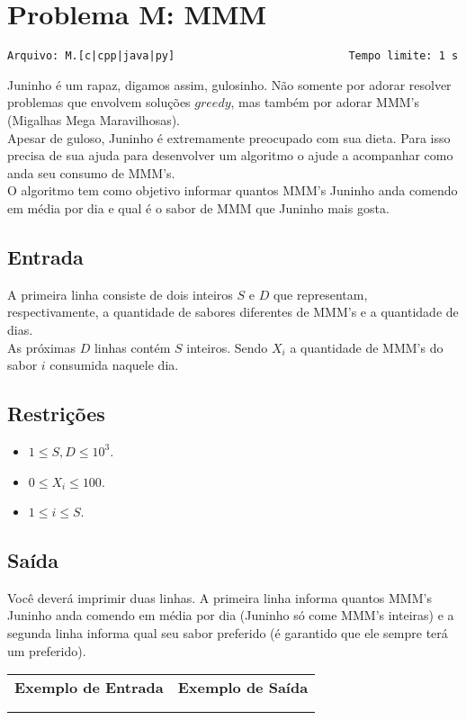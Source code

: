 \section{Problema M: MMM}
\vspace{-0.52cm}
\noindent \begin{verbatim}Arquivo: M.[c|cpp|java|py]                           Tempo limite: 1 s
\end{verbatim}

Juninho é um rapaz, digamos assim, gulosinho. Não somente por adorar resolver problemas que envolvem soluções $greedy$, mas também por adorar MMM's (Migalhas Mega Maravilhosas). \\
Apesar de guloso, Juninho é extremamente preocupado com sua dieta. Para isso precisa de sua ajuda para desenvolver um algoritmo o ajude a acompanhar como anda seu consumo de MMM's. \\

O algoritmo tem como objetivo informar quantos MMM's Juninho anda comendo em média por dia e qual é o sabor de MMM que Juninho mais gosta.

\subsection*{Entrada}

A primeira linha consiste de dois inteiros $S$ e $D$ que representam, respectivamente, a quantidade de sabores diferentes de MMM's e a quantidade de dias. \\
As próximas $D$ linhas contém $S$ inteiros. Sendo $X_i$ a quantidade de MMM's do sabor $i$ consumida naquele dia.

\subsection*{Restrições}
\begin{itemize}
    \item $1 \le S,D \le 10^{3}$.
    \item $0 \le X_i \le 100$.
    \item $1 \le i \le S$.
\end{itemize}

\subsection*{Saída}

Você deverá imprimir duas linhas. A primeira linha informa quantos MMM's Juninho anda comendo em média por dia (Juninho só come MMM's inteiras) e a segunda linha informa qual seu sabor preferido (é garantido que ele sempre terá um preferido).

\begin{flushleft}
\begin{tabularx}{1.01\textwidth}{ | p{6cm} | p{10cm} | }
\hline
\textbf{Exemplo de Entrada} & \textbf{Exemplo de Saída} \\

&

\\
\hline

&

\\
\hline
\end{tabularx}
\end{flushleft}
